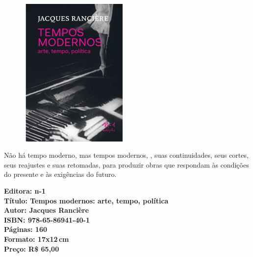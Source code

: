 \pagebreak %


\begin{center}
\hspace*{-3.6cm}
\hspace*{3.1cm}\includegraphics[width=74mm]{./CAPAS/tempos.jpg}
\end{center}

\hspace*{-7cm}\hrulefill\hspace*{-7cm}

\medskip

\noindent{}Não há tempo moderno, mas tempos modernos, , suas continuidades, seus cortes, seus reajustes e suas retomadas, para produzir obras que respondam às condições do presente e às exigências do futuro.
\vfill

\hspace*{-.4cm}\begin{minipage}[c]{.8\linewidth}
\small\textbf{
\hspace*{-.1cm}Editora: n-1\\
Título: Tempos modernos: arte, tempo, política\\
Autor: Jacques Rancière\\ 
ISBN: 978-65-86941-40-1\\
Páginas: 160\\
Formato: 17x12\,cm\\
Preço: R\$ 65,00\\
}
\end{minipage}

\pagebreak

